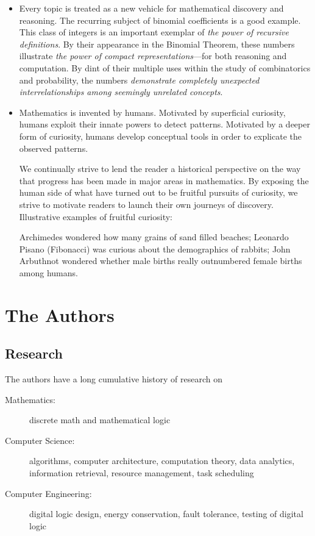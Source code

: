 \documentclass{article}[12pt]
\begin{document}
\begin{itemize}
\item
Every topic is treated as a new vehicle for mathematical discovery and reasoning.  The recurring subject of binomial coefficients is a good example.  This class of integers is an important exemplar of {\em the power of recursive definitions}.  By their appearance in the Binomial Theorem, these numbers illustrate {\em the power of compact representations}---for both reasoning and computation.  By dint of their multiple uses within the study of combinatorics and probability, the numbers {\em demonstrate completely unexpected interrelationships among seemingly unrelated concepts}.

\item
Mathematics is invented by humans.  Motivated by superficial curiosity, humans exploit their innate powers to detect patterns.  Motivated by a deeper form of curiosity, humans develop conceptual tools in order to explicate the observed patterns.

\smallskip

We continually strive to lend the reader a historical perspective on the way that progress has been made in major areas in mathematics.  By exposing the human side of what have turned out to be fruitful pursuits of curiosity, we strive to motivate readers to launch their own journeys of discovery.  Illustrative examples of fruitful curiosity:

Archimedes wondered how many grains of sand filled beaches; Leonardo Pisano (Fibonacci) was curious about the demographics of rabbits; John Arbuthnot wondered whether male births really outnumbered female births among humans. 
\end{itemize}

\section*{The Authors}

\subsection*{Research}

The authors have a long cumulative history of research on
\begin{description}
\item[{\sf Mathematics:}]
discrete math and mathematical logic
\item[{\sf Computer Science:}]
algorithms, computer architecture, computation theory, data analytics, information retrieval, resource management, task scheduling
\item[{\sf Computer Engineering:}]
digital logic design, energy conservation, fault tolerance, testing of digital logic
\end{description}
\end{document}
